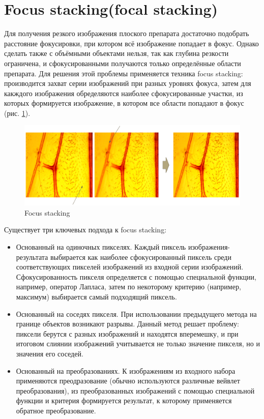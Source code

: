 \documentclass[14pt]{matmex-diploma-custom}
\begin{document}
\section{Focus stacking(focal stacking)}
Для получения резкого изображения плоского препарата достаточно подобрать расстояние фокусировки, при котором всё изображение попадает в фокус. Однако сделать также с объёмными объектами нельзя, так как глубина резкости ограничена, и сфокусированными получаются только определённые области препарата. Для решения этой проблемы применяется техника focus stacking: производится захват серии изображений при разных уровнях фокуса, затем для какждого изображения обределяются наиболее сфокусированные участки, из которых формируется изображение, в котором все области попадают в фокус (рис. \ref{focus_stacking1}).

\begin{figure}[h]
\label{focus_stacking1}
\centering
\includegraphics[width=1.0\textwidth]{figures/fs1.png}
\caption{Focus stacking}
\end{figure}

Существует три ключевых подхода к focus stacking: 
\begin{itemize}
    \item Основанный на одиночных пикселях. Каждый пиксель изображения-результата выбирается как наиболее сфокусированный пиксель среди соответствующих пикселей изображений из входной серии изображений. Сфокусированность пикселя  определяется с помощью специальной функции, например, оператор Лапласа, затем по некоторому критерию (например, максимум) выбирается самый подходящий пиксель.
    \item Основанный на соседях пикселя. При использовании предыдущего метода на границе объектов возникают разрывы. Данный метод решает проблему: пиксели берутся с разных изображений и находятся вперемешку, и при итоговом слиянии изображений учитывается не только значение пикселя, но и значения его соседей.
    \item Основанный на преобразованиях. К изображениям из входного набора применяются преодразование (обычно используются различные вейвлет преобразования), из преобразованных изображений с помощью специальной функции и критерия формируется результат, к которому применяется обратное преобразование.
\end{itemize}
\end{document}
